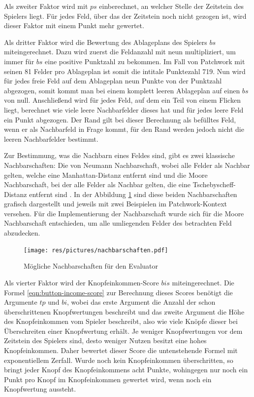 Als zweiter Faktor wird mit $ps$ einberechnet, an welcher Stelle der Zeitstein des Spielers liegt. Für jedes Feld, über das der Zeitstein noch nicht gezogen ist, wird dieser Faktor mit einem Punkt mehr gewertet.

Als dritter Faktor wird die Bewertung des Ablageplans des Spielers $bs$ miteingerechnet. Dazu wird zuerst die Feldanzahl mit neun multipliziert, um immer für $bs$ eine positive Punktzahl zu bekommen. Im Fall von Patchwork mit seinen 81 Felder pro Ablageplan ist somit die intitale Punktezahl 719. Nun wird für jedes freie Feld auf dem Ablageplan neun Punkte von der Punktzahl abgezogen, somit kommt man bei einem komplett leeren Ablageplan auf einen $bs$ von null. Anschließend wird für jedes Feld, auf dem ein Teil von einem Flicken liegt, berechnet wie viele leere Nachbarfelder dieses hat und für jedes leere Feld ein Punkt abgezogen. Der Rand gilt bei dieser Berechnung als befülltes Feld, wenn er als Nachbarfeld in Frage kommt, für den Rand werden jedoch nicht die leeren Nachbarfelder bestimmt.

\pagebreak

Zur Bestimmung, was die Nachbarn eines Feldes sind, gibt es zwei klassische Nachbarschaften: Die von Neumann Nachbarschaft, wobei alle Felder als Nachbar gelten, welche eine Manhattan-Distanz entfernt sind und die Moore Nachbarschaft, bei der alle Felder als Nachbar gelten, die eine Tschebyscheff-Distanz entfernt sind \cite[S. 2]{2016.kneighborhood}. In der Abbildung \ref{fig:nachbarschaften} sind diese beiden Nachbarschaften grafisch dargestellt und jeweils mit zwei Beispielen im Patchwork-Kontext versehen. Für die Implementierung der Nachbarschaft wurde sich für die Moore Nachbarschaft entschieden, um alle umliegenden Felder des betrachten Feld abzudecken.

\vspace*{-0.25cm}
\begin{figure}[!ht]
    \centering
    \texttt{[image: res/pictures/nachbarschaften.pdf]}
    \vspace*{-0.45cm}
    \caption{Mögliche Nachbarschaften für den Evaluator}
    \label{fig:nachbarschaften}
\end{figure}
\vspace*{-0.2cm}

Als vierter Faktor wird der Knopfeinkommen-Score $bis$ miteingerechnet. Die Formel \ref{eqn:button-income-score} zur Berechnung dieses Scores benötigt die Argumente $tp$ und $bi$, wobei das erste Argument die Anzahl der schon überschrittenen Knopfwertungen beschreibt und das zweite Argument die Höhe des Knopfeinkommen vom Spieler beschreibt, also wie viele Knöpfe dieser bei Überschreiten einer Knopfwertung erhält. Je weniger Knopfwertungen vor dem Zeitstein des Spielers sind, desto weniger Nutzen besitzt eine hohes Knopfeinkommen. Daher bewertet dieser Score die untenstehende Formel mit exponentiellem Zerfall. Wurde noch kein Knopfeinkommen überschritten, so bringt jeder Knopf des Knopfeinkommens acht Punkte, wohingegen nur noch ein Punkt pro Knopf im Knopfeinkommen gewertet wird, wenn noch ein Knopfwertung aussteht.


